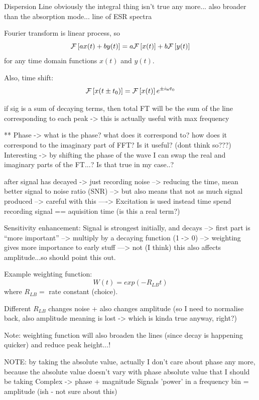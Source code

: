 Dispersion Line obviously the integral thing isn't true any more... also broader
than the absorption mode... %
line of ESR spectra

Fourier transform is linear process, so
\begin{equation} \mathcal{F}\left[a x(t) + b y(t) \right] = a \mathcal{F}\left[x(t)\right] + b \mathcal{F}\left[y(t)\right]
\end{equation} for any time domain functions $x(t)$ and $y(t)$.

Also, time shift:
$$
\mathcal{F}\left[x(t \pm t_0)\right] = \mathcal{F}\left[x(t)\right] e^{\pm i \omega t_0}
$$

if sig is a sum of decaying terms, then total FT will be the sum of the line
corresponding to each peak -> this is actually useful with max frequency

** Phase -> what is the phase? what does it correspond to? how does it
correspond to the imaginary part of FFT? Is it useful? (dont think so???)
Interesting -> by shifting the phase of the wave I can swap the real and
imaginary parts of the FT...? Is that true in my case..?

after signal has decayed -> just recording noise --> reducing the time, mean
better signal to noise ratio (SNR) --> but also means that not as much signal
produced --> careful with this ----> Excitation is used instead time spend
recording signal == aquisition time (is this a real term?)

Sensitivity enhancement: Signal is strongest initially, and decays --> first
part is ``more important'' --> multiply by a decaying function (1 -> 0) -->
weighting gives more importance to early stuff ---> not (I think) this also
affects amplitude...so should point this out.

Example weighting function:
$$
W(t) = exp(-R_{LB} t)
$$
where $R_{LB} = $ rate constant (choice).

Different $R_{LB}$ changes noise + also changes amplitude (so I need to
normalise back, also amplitude meaning is lost -> which is kinda true anyway,
right?)

Note: weighting function will also broaden the lines (since decay is happening
quicker) and reduce peak height...!

NOTE: by taking the absolute value, actually I don't care about phase any more,
because the absolute value doesn't vary with phase %
absolute value that I should be taking Complex -> phase + magnitude Signals
'power' in a frequency bin = amplitude (ish - not sure about this)

